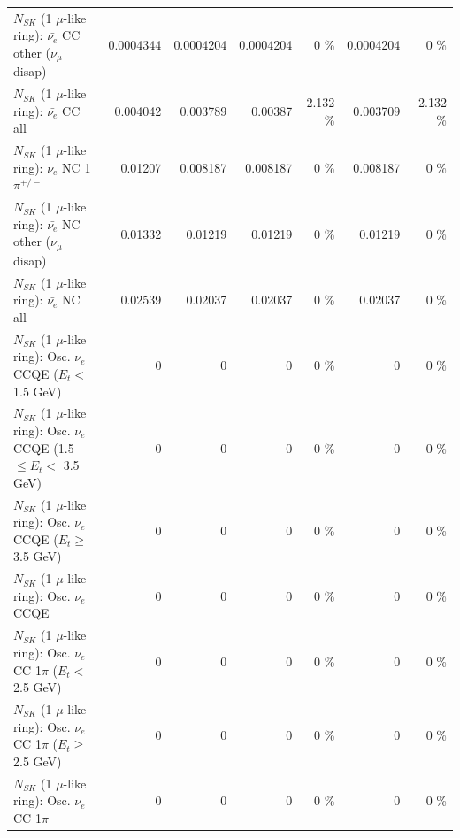 \begin{table}
\begin{tabular}{| l | r | r | r  r | r  r |}
          $N_{SK}$ (1 $\mu$-like ring): $\bar{\nu_e}$ CC other ($\nu_\mu$ disap) &       0.0004344 &       0.0004204 &       0.0004204 &        0 \%  &       0.0004204 &        0 \%  \\ 
                            $N_{SK}$ (1 $\mu$-like ring): $\bar{\nu_{e}}$ CC all &        0.004042 &        0.003789 &         0.00387 &    2.132 \%  &        0.003709 &   -2.132 \%  \\ 
\hline
                     $N_{SK}$ (1 $\mu$-like ring): $\bar{\nu_e}$ NC 1$\pi^{+/-}$ &         0.01207 &        0.008187 &        0.008187 &        0 \%  &        0.008187 &        0 \%  \\ 
          $N_{SK}$ (1 $\mu$-like ring): $\bar{\nu_e}$ NC other ($\nu_\mu$ disap) &         0.01332 &         0.01219 &         0.01219 &        0 \%  &         0.01219 &        0 \%  \\ 
                            $N_{SK}$ (1 $\mu$-like ring): $\bar{\nu_{e}}$ NC all &         0.02539 &         0.02037 &         0.02037 &        0 \%  &         0.02037 &        0 \%  \\ 
\hline
\hline
\hline
             $N_{SK}$ (1 $\mu$-like ring): Osc. $\nu_e$ CCQE ($E_{t} <$ 1.5 GeV) &               0 &               0 &               0 &        0 \%  &               0 &        0 \%  \\ 
    $N_{SK}$ (1 $\mu$-like ring): Osc. $\nu_e$ CCQE (1.5 $\leq E_{t} <$ 3.5 GeV) &               0 &               0 &               0 &        0 \%  &               0 &        0 \%  \\ 
          $N_{SK}$ (1 $\mu$-like ring): Osc. $\nu_e$ CCQE ($E_{t} \geq$ 3.5 GeV) &               0 &               0 &               0 &        0 \%  &               0 &        0 \%  \\ 
\hline
                                 $N_{SK}$ (1 $\mu$-like ring): Osc. $\nu_e$ CCQE &               0 &               0 &               0 &        0 \%  &               0 &        0 \%  \\ 
\hline
        $N_{SK}$ (1 $\mu$-like ring): Osc. $\nu_e$ CC 1$\pi$ ($E_{t} <$ 2.5 GeV) &               0 &               0 &               0 &        0 \%  &               0 &        0 \%  \\ 
     $N_{SK}$ (1 $\mu$-like ring): Osc. $\nu_e$ CC 1$\pi$ ($E_{t} \geq$ 2.5 GeV) &               0 &               0 &               0 &        0 \%  &               0 &        0 \%  \\ 
\hline
                            $N_{SK}$ (1 $\mu$-like ring): Osc. $\nu_e$ CC 1$\pi$ &               0 &               0 &               0 &        0 \%  &               0 &        0 \%  \\ 

\end{tabular}
\end{table}
